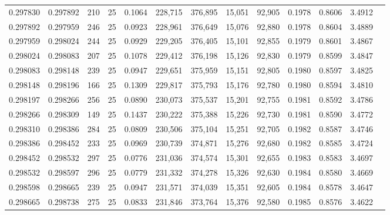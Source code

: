 \begin{tabular}{rrrrrrrrrrrrr}
0.297830 & 0.297892 &   210 &  25 &                                     0.1064 & 228,715 & 376,895 &  15,051 &  92,905 & 0.1978 & 0.8606 & 3.4912 \\
0.297892 & 0.297959 &   246 &  25 &                                     0.0923 & 228,961 & 376,649 &  15,076 &  92,880 & 0.1978 & 0.8604 & 3.4889 \\
0.297959 & 0.298024 &   244 &  25 &                                     0.0929 & 229,205 & 376,405 &  15,101 &  92,855 & 0.1979 & 0.8601 & 3.4867 \\
0.298024 & 0.298083 &   207 &  25 &                                     0.1078 & 229,412 & 376,198 &  15,126 &  92,830 & 0.1979 & 0.8599 & 3.4847 \\
0.298083 & 0.298148 &   239 &  25 &                                     0.0947 & 229,651 & 375,959 &  15,151 &  92,805 & 0.1980 & 0.8597 & 3.4825 \\
0.298148 & 0.298196 &   166 &  25 &                                     0.1309 & 229,817 & 375,793 &  15,176 &  92,780 & 0.1980 & 0.8594 & 3.4810 \\
0.298197 & 0.298266 &   256 &  25 &                                     0.0890 & 230,073 & 375,537 &  15,201 &  92,755 & 0.1981 & 0.8592 & 3.4786 \\
0.298266 & 0.298309 &   149 &  25 &                                     0.1437 & 230,222 & 375,388 &  15,226 &  92,730 & 0.1981 & 0.8590 & 3.4772 \\
0.298310 & 0.298386 &   284 &  25 &                                     0.0809 & 230,506 & 375,104 &  15,251 &  92,705 & 0.1982 & 0.8587 & 3.4746 \\
0.298386 & 0.298452 &   233 &  25 &                                     0.0969 & 230,739 & 374,871 &  15,276 &  92,680 & 0.1982 & 0.8585 & 3.4724 \\
0.298452 & 0.298532 &   297 &  25 &                                     0.0776 & 231,036 & 374,574 &  15,301 &  92,655 & 0.1983 & 0.8583 & 3.4697 \\
0.298532 & 0.298597 &   296 &  25 &                                     0.0779 & 231,332 & 374,278 &  15,326 &  92,630 & 0.1984 & 0.8580 & 3.4669 \\
0.298598 & 0.298665 &   239 &  25 &                                     0.0947 & 231,571 & 374,039 &  15,351 &  92,605 & 0.1984 & 0.8578 & 3.4647 \\
0.298665 & 0.298738 &   275 &  25 &                                     0.0833 & 231,846 & 373,764 &  15,376 &  92,580 & 0.1985 & 0.8576 & 3.4622 \\

\end{tabular}
